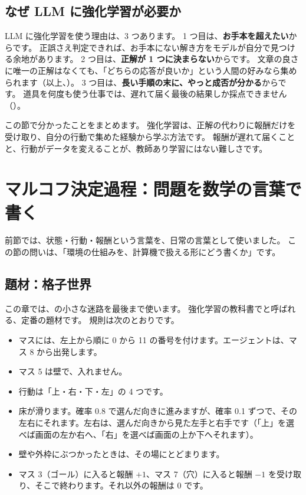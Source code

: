 \subsection*{なぜ LLM に強化学習が必要か}

LLM に強化学習を使う理由は、3 つあります。
1 つ目は、\textbf{お手本を超えたい}からです。
正誤さえ判定できれば、お手本にない解き方をモデルが自分で見つける余地があります。
2 つ目は、\textbf{正解が 1 つに決まらない}からです。
文章の良さに唯一の正解はなくても、「どちらの応答が良いか」という人間の好みなら集められます（以上、）。
3 つ目は、\textbf{長い手順の末に、やっと成否が分かる}からです。
道具を何度も使う仕事では、遅れて届く最後の結果しか採点できません（）。

この節で分かったことをまとめます。
強化学習は、正解の代わりに報酬だけを受け取り、自分の行動で集めた経験から学ぶ方法です。
報酬が遅れて届くことと、行動がデータを変えることが、教師あり学習にはない難しさです。

\section{マルコフ決定過程：問題を数学の言葉で書く}\label{sec:rlb-mdp}

前節では、状態・行動・報酬という言葉を、日常の言葉として使いました。
この節の問いは、「環境の仕組みを、計算機で扱える形にどう書くか」です。

\subsection*{題材：格子世界}

この章では、の小さな迷路を最後まで使います。
強化学習の教科書でと呼ばれる、定番の題材です\cite{sutton2018rl}。
規則は次のとおりです。
\begin{itemize}
\item マスには、左上から順に 0 から 11 の番号を付けます。エージェントは、マス 8 から出発します。
\item マス 5 は壁で、入れません。
\item 行動は「上・右・下・左」の 4 つです。
\item 床が滑ります。確率 0.8 で選んだ向きに進みますが、確率 0.1 ずつで、その左右にそれます。左右は、選んだ向きから見た左手と右手です（「上」を選べば画面の左か右へ、「右」を選べば画面の上か下へそれます）。
\item 壁や外枠にぶつかったときは、その場にとどまります。
\item マス 3（ゴール）に入ると報酬 $+1$、マス 7（穴）に入ると報酬 $-1$ を受け取り、そこで終わります。それ以外の報酬は 0 です。
\end{itemize}

